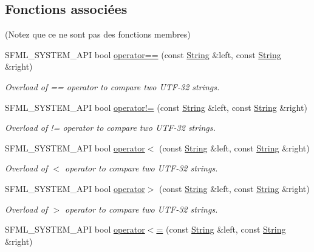 \subsection*{Fonctions associées}
(Notez que ce ne sont pas des fonctions membres) \begin{DoxyCompactItemize}
\item 
S\+F\+M\+L\+\_\+\+S\+Y\+S\+T\+E\+M\+\_\+\+A\+PI bool \hyperlink{classsf_1_1String_a2a385459fa9a237e61a712fa956d489e}{operator==} (const \hyperlink{classsf_1_1String}{String} \&left, const \hyperlink{classsf_1_1String}{String} \&right)
\begin{DoxyCompactList}\small\item\em Overload of == operator to compare two U\+T\+F-\/32 strings. \end{DoxyCompactList}\item 
S\+F\+M\+L\+\_\+\+S\+Y\+S\+T\+E\+M\+\_\+\+A\+PI bool \hyperlink{classsf_1_1String_a2b592c36be218b4811795fdc84eecc69}{operator!=} (const \hyperlink{classsf_1_1String}{String} \&left, const \hyperlink{classsf_1_1String}{String} \&right)
\begin{DoxyCompactList}\small\item\em Overload of != operator to compare two U\+T\+F-\/32 strings. \end{DoxyCompactList}\item 
S\+F\+M\+L\+\_\+\+S\+Y\+S\+T\+E\+M\+\_\+\+A\+PI bool \hyperlink{classsf_1_1String_ac2ca5a7703402a2bbafd85eec6d1e846}{operator$<$} (const \hyperlink{classsf_1_1String}{String} \&left, const \hyperlink{classsf_1_1String}{String} \&right)
\begin{DoxyCompactList}\small\item\em Overload of $<$ operator to compare two U\+T\+F-\/32 strings. \end{DoxyCompactList}\item 
S\+F\+M\+L\+\_\+\+S\+Y\+S\+T\+E\+M\+\_\+\+A\+PI bool \hyperlink{classsf_1_1String_a5efc1eca58cf5c17d01eb8501d303538}{operator$>$} (const \hyperlink{classsf_1_1String}{String} \&left, const \hyperlink{classsf_1_1String}{String} \&right)
\begin{DoxyCompactList}\small\item\em Overload of $>$ operator to compare two U\+T\+F-\/32 strings. \end{DoxyCompactList}\item 
S\+F\+M\+L\+\_\+\+S\+Y\+S\+T\+E\+M\+\_\+\+A\+PI bool \hyperlink{classsf_1_1String_abd342b6094b81cd086c7929b53b112ae}{operator$<$=} (const \hyperlink{classsf_1_1String}{String} \&left, const \hyperlink{classsf_1_1String}{String} \&right)

\end{DoxyCompactItemize}
